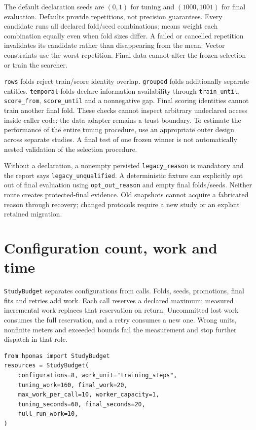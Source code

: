 The default declaration seeds are $(0,1)$ for tuning and $(1000,1001)$ for
final evaluation. Defaults provide repetitions, not precision guarantees.
Every candidate runs all declared fold/seed combinations; means weight each
combination equally even when fold sizes differ. A failed or cancelled
repetition invalidates its candidate rather than disappearing from the mean.
Vector constraints use the worst repetition. Final data cannot alter the
frozen selection or train the searcher.

\texttt{rows} folds reject train/score identity overlap. \texttt{grouped}
folds additionally separate entities. \texttt{temporal} folds declare
information availability through \texttt{train\_until}, \texttt{score\_from},
\texttt{score\_until} and a nonnegative gap. Final scoring identities cannot
train another final fold. These checks cannot inspect arbitrary undeclared
access inside caller code; the data adapter remains a trust boundary.
To estimate the performance of the entire tuning procedure, use an appropriate
outer design across separate studies. A final test of one frozen winner is not
automatically nested validation of the selection procedure.

Without a declaration, a nonempty persisted \texttt{legacy\_reason} is
mandatory and the report says \texttt{legacy\_unqualified}. A deterministic
fixture can explicitly opt out of final evaluation using
\texttt{opt\_out\_reason} and empty final folds/seeds. Neither route creates
protected-final evidence. Old snapshots cannot acquire a fabricated reason
through recovery; changed protocols require a new study or an explicit
retained migration.

\section{Configuration count, work and time}

\texttt{StudyBudget} separates configurations from calls. Folds, seeds,
promotions, final fits and retries add work. Each call reserves a declared
maximum; measured incremental work replaces that reservation on return.
Uncommitted lost work consumes the full reservation, and a retry consumes a
new one. Wrong units, nonfinite meters and exceeded bounds fail the measurement
and stop further dispatch in that role.

\begin{verbatim}
from hponas import StudyBudget
resources = StudyBudget(
    configurations=8, work_unit="training_steps",
    tuning_work=160, final_work=20,
    max_work_per_call=10, worker_capacity=1,
    tuning_seconds=60, final_seconds=20,
    full_run_work=10,
)
\end{verbatim}


